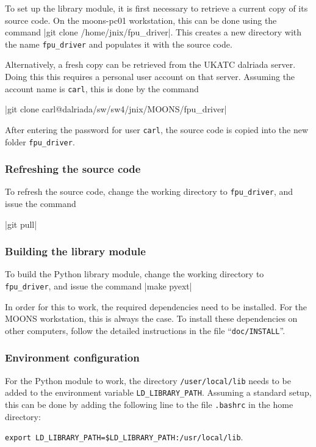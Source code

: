 \documentclass{scrartcl}[12pt,a4paper]
\begin{document}
To set up the library module, it is first
necessary to retrieve a current copy of its source code.
On the moons-pc01 workstation, this can be done using the
command |git clone /home/jnix/fpu_driver|.
This creates a new directory with the name \texttt{fpu\_driver}
and populates it with the source code.

Alternatively, a fresh copy can be retrieved from the UKATC dalriada
server. Doing this this requires a personal user account on that
server. Assuming the account name is \texttt{carl}, this is done by
the command

|git clone carl@dalriada/sw/sw4/jnix/MOONS/fpu_driver|

After entering the password for user \texttt{carl}, the
source code is copied into the new folder \texttt{fpu\_driver}.

\subsubsection{Refreshing the source code}
To refresh the source code, change the
working directory to \texttt{fpu\_driver},
and issue the command

|git pull|

\subsubsection{Building the library module}

To build the Python library module,
change the working directory to \texttt{fpu\_driver},
and issue the command |make pyext|

In order for this to work, the required dependencies need to be
installed. For the MOONS workstation, this is always the case. To
install these dependencies on other computers, follow the detailed
instructions in the file ``\texttt{doc/INSTALL}''.

\subsubsection{Environment configuration}

For the Python module to work, the directory \texttt{/user/local/lib}
needs to be added to the environment variable
\texttt{LD\_LIBRARY\_PATH}.  Assuming a standard setup, this can be
done by adding the following line to the file \texttt{.bashrc} in the
home directory:

\texttt{export LD\_LIBRARY\_PATH=\$LD\_LIBRARY\_PATH:/usr/local/lib}.
\end{document}
